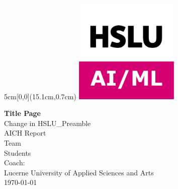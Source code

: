\begin{titlepage}
	\begin{textblock*}{5cm}[0,0](15.1cm,0.7cm)
		\includegraphics[keepaspectratio,width=5cm]{img/HSLU-AIML.png}
	\end{textblock*}
	\begin{center}
		\vspace*{5cm}
		\Huge{\textbf{Title Page}} \\
		\Large{Change in HSLU\_Preamble}\\
		\vspace{0.5em}
		\Large{AICH Report}\\
		\vspace{3em}
		\LARGE{Team}\\
		\vspace{1em}
		\Large{Students}\\
		\vspace{1em}
		\Large{Coach: }\\
		\vfill
		\large{Lucerne University of Applied Sciences and Arts}\\
		\large{\today}
	\end{center}
\end{titlepage}

